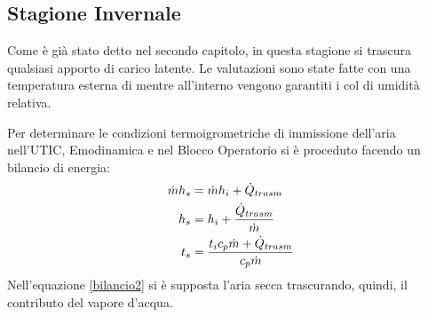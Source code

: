 \subsection{Stagione Invernale}
Come è già stato detto nel secondo capitolo, in questa stagione si trascura qualsiasi apporto di carico latente. Le valutazioni sono state fatte con una temperatura esterna di  mentre all'interno vengono garantiti i  col  di umidità relativa.

Per determinare le condizioni termoigrometriche di immissione dell'aria nell'UTIC, Emodinamica e nel Blocco Operatorio si è proceduto facendo un bilancio di energia:
\begin{align}
\dot{m}h_s	&	=\dot{m}h_i+\dot{Q}_{trasm}		\label{bilancio}\\
h_s			&	=h_i+\frac{\dot{Q}_{trasm}}{\dot{m}}	\notag\\
t_s			&	=\frac{t_ic_p\dot{m}+\dot{Q}_{trasm}}{c_p\dot{m}}\label{bilancio2}
\end{align}
Nell'equazione \vref{bilancio2} si è supposta l'aria secca trascurando, quindi, il contributo del vapore d'acqua.

